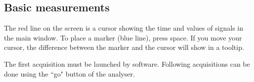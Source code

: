 \documentclass[10pt,a4paper]{article}
\theoremstyle{definition}%
\begin{document}
\subsection{Basic measurements}
The red line on the screen is a cursor showing the time and values of signals in the main window. To place a marker (blue line), press space. If you move your cursor, the difference between the marker and the cursor will show in a tooltip.

The first acquisition must be launched by software. Following acquisitions can be done using the ``go" button of the analyser.
\end{document}
